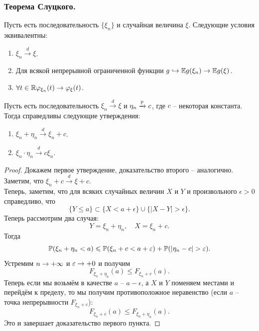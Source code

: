 \subsubsection{Теорема Слуцкого.}
\begin{theorem}
    Пусть есть последовательность $\{\xi_n\}$ и случайная величина $\xi$.
    Следующие условия эквивалентны:
    \begin{enumerate}
        \item $\xi_n \xrightarrow{d} \xi$.
        \item Для всякой непрерывной ограниченной функции $g \hookrightarrow \Ex g(\xi_n) \ra \Ex g(\xi)$.
        \item $\forall t \in \R \phi_{\xi_n}(t) \ra \phi_{\xi}(t)$.
    \end{enumerate}
\end{theorem}
\begin{theorem}[Слуцкий]
    Пусть есть последовательность $\xi_n \xrightarrow{d} \xi$ и $\eta_n \xrightarrow{\P} c$, где $c$ -- некоторая константа.
    Тогда справедливы следующие утверждения:
    \begin{enumerate}
        \item $\xi_n + \eta_n \xrightarrow{d} \xi_n + c$.
        \item $\xi_n \cdot \eta_n \xrightarrow{d} c\xi_n$.
    \end{enumerate}
\end{theorem}
\begin{proof}
    Докажем первое утверждение, доказательство второго -- аналогично. \\
    Заметим, что $\xi_n + c \xrightarrow{d} \xi + c$. \\
    Теперь, заметим, что для всяких случайных величин $X$ и $Y$ и произвольного $\epsilon > 0$ справедливо, что
    \[
        \{Y \leq a\} \subset \{X < a + \epsilon\} \cup \{ |X - Y| > \epsilon \}.
    \]
    Теперь рассмотрим два случая:
    \[
        Y = \xi_n + \eta_n, \quad X = \xi_n + c.
    \]
    Тогда
    \[
        \P(\xi_n + \eta_n < a) \leq \P(\xi_n + c < a + \epsilon) + \P(|\eta_n - c| > \epsilon).
    \]
    Устремим $n \ra +\infty$ и $\epsilon \ra +0$ и получим
    \[
        F_{\xi_n + \eta_n}(a) \leq F_{\xi_n + c}(a).
    \]
    Теперь если мы возьмём в качестве $a$ -- $a - \epsilon$, а $X$ и $Y$ поменяем местами и перейдём к пределу, то мы получим противоположное неравенство (если $a$ -- точка непрерывности $F_{\xi_n + c}$):
    \[
        F_{\xi_n + c}(a) \leq F_{\xi_n + \eta_n}(a).
    \]
    Это и завершает доказательство первого пункта.
\end{proof}
